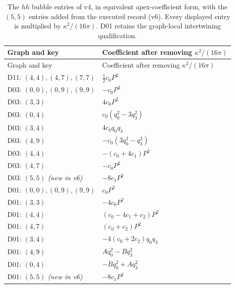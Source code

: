 \documentclass[11pt,a4paper]{article}
\newcommand{\ka}{\kappa}
\theoremstyle{plain}
\theoremstyle{definition}
\theoremstyle{remark}
\numberwithin{equation}{section}
\begin{document}
\begin{longtable}{@{}L{.27\linewidth}L{.64\linewidth}@{}}
\caption{The \(hh\) bubble entries of v4, in equivalent
apex-coefficient form, with the \((5,5)\) entries added from the
executed record (v6).
Every displayed entry is multiplied by \(\ka^2/(16\pi)\).
D01 retains the graph-local intertwining qualification.}
\label{tab:hhC}\\
\toprule
Graph and key & Coefficient after removing \(\ka^2/(16\pi)\)\\
\midrule
\endfirsthead
\toprule
Graph and key & Coefficient after removing \(\ka^2/(16\pi)\)\\
\midrule
\endhead
\bottomrule
\endfoot

D11:
\((4,4),(4,7),(7,7)\)
&
\(\displaystyle \frac12 c_0P^2\)\\[5pt]

D03:
\((0,0),(0,9),(9,9)\)
&
\(\displaystyle -c_0P^2\)\\[5pt]

D03:
\((3,3)\)
&
\(\displaystyle 4c_0P^2\)\\[5pt]

D03:
\((0,4)\)
&
\(\displaystyle c_0(q_0^2-3q_3^2)\)\\[5pt]

D03:
\((3,4)\)
&
\(\displaystyle 4c_0q_0q_3\)\\[5pt]

D03:
\((4,9)\)
&
\(\displaystyle -c_0(3q_0^2-q_3^2)\)\\[5pt]

D03:
\((4,4)\)
&
\(\displaystyle -(c_0+4c_1)P^2\)\\[5pt]

D03:
\((4,7)\)
&
\(\displaystyle -c_0P^2\)\\[5pt]

D03:
\((5,5)\) \emph{(new in v6)}
&
\(\displaystyle -8c_1P^2\)\\[5pt]

D01:
\((0,0),(0,9),(9,9)\)
&
\(\displaystyle c_0P^2\)\\[5pt]

D01:
\((3,3)\)
&
\(\displaystyle -4c_0P^2\)\\[5pt]

D01:
\((4,4)\)
&
\(\displaystyle (c_0-4c_1+c_2)P^2\)\\[5pt]

D01:
\((4,7)\)
&
\(\displaystyle (c_0+c_2)P^2\)\\[5pt]

D01:
\((3,4)\)
&
\(\displaystyle -4(c_0+2c_2)q_0q_3\)\\[5pt]

D01:
\((4,9)\)
&
\(\displaystyle A q_0^2-Bq_3^2\)\\[5pt]

D01:
\((0,4)\)
&
\(\displaystyle -Bq_0^2+Aq_3^2\)\\[5pt]

D01:
\((5,5)\) \emph{(new in v6)}
&
\(\displaystyle -8c_1P^2\)\\

\end{longtable}
\end{document}
